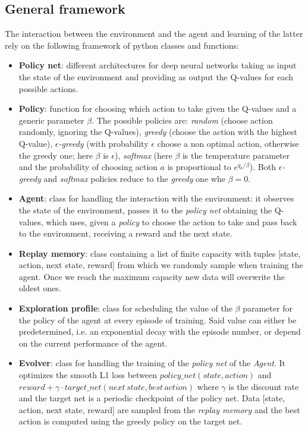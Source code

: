 \documentclass[a4paper, 11pt]{article}
\begin{document}
  \subsection{General framework}
    The interaction between the environment and the agent and learning of the latter rely on the following framework of python classes and functions:
    \begin{itemize}
      \item \textbf{Policy net}: different architectures for deep neural networks taking as input the state of the environment and providing as output the Q-values for each possible actions.
      \item \textbf{Policy}: function for choosing which action to take given the Q-values and a generic parameter $\beta$. The possible policies are:
      \emph{random} (choose action randomly, ignoring the Q-values), \emph{greedy} (choose the action with the highest Q-value), \emph{$\epsilon$-greedy} (with probability $\epsilon$ choose a non optimal action, otherwise the greedy one; here $\beta$ is $\epsilon$), \emph{softmax} (here $\beta$ is the temperature parameter and the probability of choosing action $a$ is proportional to $e^{q_a/\beta}$). Both \emph{$\epsilon$-greedy} and \emph{softmax} policies reduce to the \emph{greedy} one whe $\beta = 0$.
      \item \textbf{Agent}: class for handling the interaction with the environment: it observes the state of the environment, passes it to the \emph{policy net} obtaining the Q-values, which uses, given a \emph{policy} to choose the action to take and pass back to the environment, receiving a reward and the next state.
      \item \textbf{Replay memory}: class containing a list of finite capacity with tuples [state, action, next state, reward] from which we randomly sample when training the agent. Once we reach the maximum capacity new data will overwrite the oldest ones.
      \item \textbf{Exploration profile}: class for scheduling the value of the $\beta$ parameter for the policy of the agent at every episode of training. Said value can either be predetermined, i.e. an exponential decay with the episode number, or depend on the current performance of the agent.
      \item \textbf{Evolver}: class for handling the training of the \emph{policy net} of the \emph{Agent}. It optimizes the smooth L1 loss between  $policy\_net(state, action)$ and $reward + \gamma \cdot target\_net(next\, state, best\, action)$ where $\gamma$ is the discount rate and the target net is a periodic checkpoint of the policy net. Data [state, action, next state, reward] are sampled from the \emph{replay memory} and the best action is computed using the greedy policy on the target net.
    \end{itemize}
\end{document}
